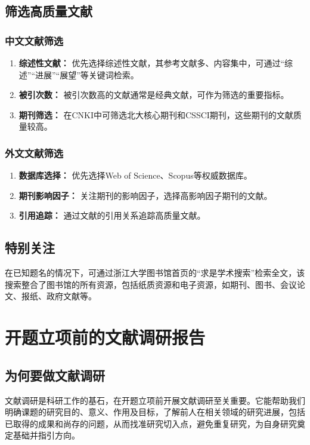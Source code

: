 \documentclass{amznotes}
\begin{document}
\subsection{筛选高质量文献}

\subsubsection{中文文献筛选}

\begin{enumerate}
  \item \textbf{综述性文献：} 优先选择综述性文献，其参考文献多、内容集中，可通过“综述”“进展”“展望”等关键词检索。
  \item \textbf{被引次数：} 被引次数高的文献通常是经典文献，可作为筛选的重要指标。
  \item \textbf{期刊筛选：} 在CNKI中可筛选北大核心期刊和CSSCI期刊，这些期刊的文献质量较高。
\end{enumerate}

\subsubsection{外文文献筛选}

\begin{enumerate}
  \item \textbf{数据库选择：} 优先选择Web of Science、Scopus等权威数据库。
  \item \textbf{期刊影响因子：} 关注期刊的影响因子，选择高影响因子期刊的文献。
  \item \textbf{引用追踪：} 通过文献的引用关系追踪高质量文献。
\end{enumerate}

\subsection{特别关注}

在已知题名的情况下，可通过浙江大学图书馆首页的“求是学术搜索”检索全文，该搜索整合了图书馆的所有资源，包括纸质资源和电子资源，如期刊、图书、会议论文、报纸、政府文献等。

\section{开题立项前的文献调研报告}
\subsection{为何要做文献调研}
文献调研是科研工作的基石，在开题立项前开展文献调研至关重要。它能帮助我们明确课题的研究目的、意义、作用及目标，了解前人在相关领域的研究进展，包括已取得的成果和尚存的问题，从而找准研究切入点，避免重复研究，为自身研究奠定基础并指引方向。
\end{document}
